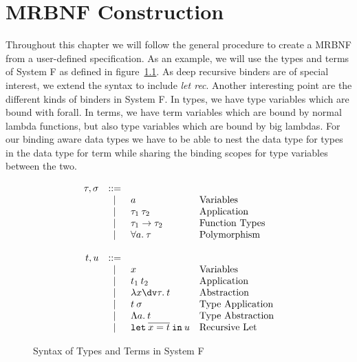 \chapter{MRBNF Construction}

Throughout this chapter we will follow the general procedure to create a \ac{MRBNF} from a user-defined specification. As an example, we will use the types and terms of System F as defined in figure~\ref{fig:systemf_syntax}. As deep recursive binders are of special interest, we extend the syntax to include \textit{let rec}. Another interesting point are the different kinds of binders in System F. In types, we have type variables which are bound with forall. In terms, we have term variables which are bound by normal lambda functions, but also type variables which are bound by big lambdas. For our binding aware data types we have to be able to nest the data type for types in the data type for term while sharing the binding scopes for type variables between the two.

\begin{figure}[H]
\[
\begin{array}{rcll}
\tau, \sigma & \bnfeq &  & \\ %
& \bnfor & a & \text{Variables} \\
& \bnfor & \tau_1 \: \tau_2 & \text{Application} \\
& \bnfor & \tau_1 \to \tau_2 & \text{Function Types} \\
& \bnfor & \forall a. \: \tau & \text{Polymorphism} \\
& & & \\
t, u & \bnfeq & & \\
& \bnfor & x & \text{Variables} \\
& \bnfor & t_1 \: t_2 & \text{Application} \\
& \bnfor & \lambda x\dv\tau. \: t & \text{Abstraction} \\
& \bnfor & t \: \sigma & \text{Type Application} \\
& \bnfor & \Lambda a . \: t & \text{Type Abstraction} \\
& \bnfor & \texttt{let} \: \overline{x = t} \: \texttt{in} \: u & \text{Recursive Let} \\
\end{array}
\]
\caption{Syntax of Types and Terms in System F}
\label{fig:systemf_syntax}
\end{figure}

